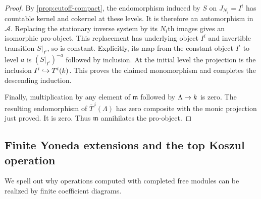 \begin{proof}
By \cref{prop:cutoff-compact}, the endomorphism induced by $S$ on
$J_{N_i}=I^i$ has countable kernel and cokernel at these levels.
It is therefore an automorphism in $\mathcal A$.  Replacing the
stationary inverse system by its $N_i$th images gives an isomorphic
pro-object.  This replacement has underlying object $I^i$ and
invertible transition $S|_{I^i}$, so is constant.  Explicitly, its
map from the constant object $I^i$ to level $a$ is
$(S|_{I^i})^{-a}$ followed by inclusion.  At the initial level the
projection is the inclusion $I^i\hookrightarrow T^i(k)$.
This proves the claimed monomorphism and completes the descending
induction.

Finally, multiplication by any element of $\mathfrak m$ followed
by $\Lambda\to k$ is zero.  The resulting endomorphism of
$\overline T^{\,i}(\Lambda)$ has zero composite with the monic
projection just proved.  It is zero.  Thus $\mathfrak m$ annihilates
the pro-object.
\end{proof}

\subsection{Finite Yoneda extensions and the top Koszul operation}

We spell out why operations computed with completed free modules
can be realized by finite coefficient diagrams.


